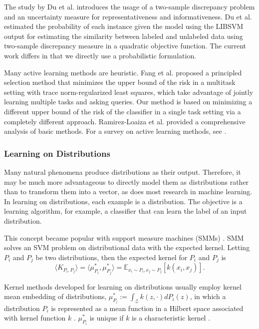 \documentclass[10pt,twocolumn]{IEEEtran}
\begin{document}
	The study by Du et al. \cite{du2017exploring} introduces the usage of a two-sample discrepancy problem and an uncertainty measure for representativeness and informativeness. Du et al. \cite{du2017exploring} estimated the probability of each instance given the model using the LIBSVM output \cite{chang2011libsvm} for estimating the similarity between labeled and unlabeled data using two-sample discrepancy measure in a quadratic objective function. The current work differs in that we directly use a probabilistic formulation.
	
	Many active learning methods are heuristic. Fang et al. \cite{fang2017active} proposed a principled selection method that minimizes the upper bound of the risk in a multitask setting with trace norm-regularized least squares, which take advantage of jointly learning multiple tasks and asking queries. Our method is based on minimizing a different upper bound of the risk of the classifier in a single task setting via a completely different approach. Ramirez-Loaiza et al. \cite{ramirez2017active} provided a comprehensive analysis of basic methods. For a survey on active learning methods, see \cite{settles2012active}.
	
	\subsubsection{Learning on Distributions}
	Many natural phenomena produce distributions as their output. Therefore, it may be much more advantageous to directly model them as distributions rather than to transform them into a vector, as does most research in machine learning. In learning on distributions, each example is a distribution. The objective is a learning algorithm, for example, a classifier that can learn the label of an input distribution.
	
	This concept became popular with support measure machines (SMMs) \cite{muandet2012learning}. SMM solves an SVM problem on distributional data with the expected kernel. Letting $P_i$ and $P_j$ be two distributions, then the expected kernel for $P_i$ and $P_j$ is
	\begin{equation}
		\langle K_{P_i, P_j} \rangle = \langle \mu^*_{P_i}, \mu^*_{P_j} \rangle = \mathbb{E}_{x_i \sim P_i, x_j \sim P_j} \left[ k(x_i, x_j) \right].
	\end{equation}
	
	Kernel methods developed for learning on distributions usually employ kernel mean embedding of distributions, $\mu^*_{P_i} := \int_{\mathcal{Z}} k(z, \cdot) dP_i(z)$, in which a distribution $P_i$ is represented as a mean function in a Hilbert space associated with kernel function $k$ \cite{smola2007hilbert}. $\mu^*_{P_i}$ is unique if $k$ is a characteristic kernel \cite{muandet2017kernel}.
	
\end{document}
